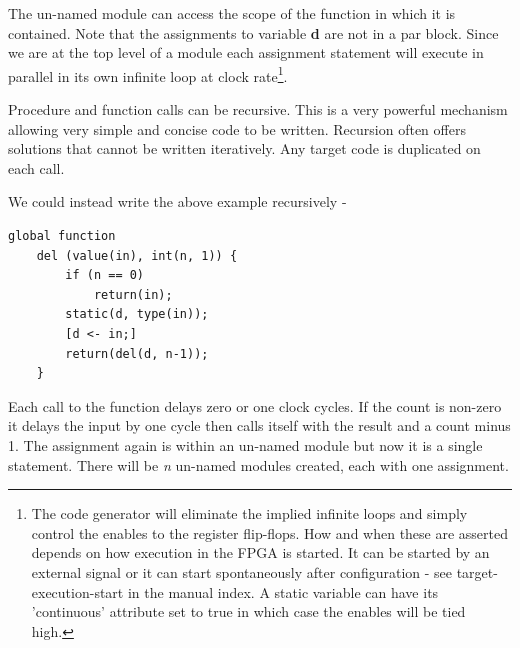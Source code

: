 \documentclass[10pt,a4paper,twoside,fleqn]{article}
\newcommand{\var}[1]{{\bf #1}} %
\begin{document}
    The un-named module can access the scope of the function in which it is contained.
    Note that the assignments to variable \var{d} are not in a par block. Since we are
    at the top level of a module each assignment statement will execute in parallel in
    its own infinite loop at clock rate\footnote{The code generator will eliminate the
    implied infinite loops and simply control the enables to the register flip-flops.
    How and when these are asserted depends on how execution in the FPGA is started. It
    can be started by an external signal or it can start spontaneously after
    configuration - see target-execution-start in the manual index. A static variable
    can have its 'continuous' attribute set to true in which case the enables will be
    tied high.}.
    
    Procedure and function calls can be recursive. This is a very powerful
    mechanism allowing very simple and concise code to be written. Recursion
    often offers solutions that cannot be written iteratively. Any target code
    is duplicated on each call.
        
    We could instead write the above example recursively -    
    \begin{lstlisting}[language=threepl]
    global function
    del (value(in), int(n, 1)) {
        if (n == 0)
            return(in);
        static(d, type(in));
        [d <- in;]
        return(del(d, n-1));
    }
    \end{lstlisting}
    Each call to the function delays zero or one clock cycles. If the count
    is non-zero it delays the input by one cycle then calls itself with the
    result and a count minus 1. The assignment again is within an un-named
    module but now it is a single statement. There will be {\em n}
    un-named modules created, each with one assignment.
    
\end{document}
